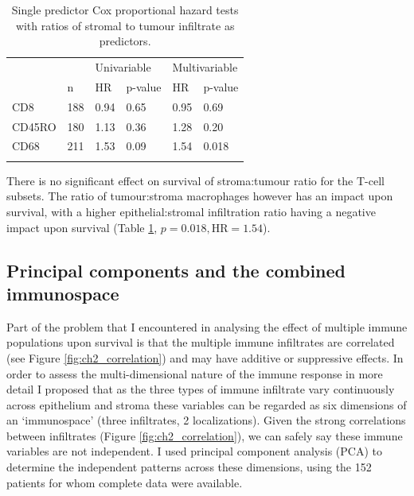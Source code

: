 \begin{table}[ht]
\centering
\begin{tabular}{llllll} \hline
 	&		&	\multicolumn{2}{l}{Univariable}			&	\multicolumn{2}{l}{Multivariable}			\\
 	    &	n	&	HR	&	p-value	    &	HR	&	p-value	\\ \hline
CD8	    &	188	&	0.94	&	0.65	&	0.95	&	0.69	\\
CD45RO	&	180	&	1.13	&	0.36	&	1.28	&	0.20	\\
CD68	&	211	&	1.53	&	0.09	&	1.54	&	0.018	\\

   \hline
\multicolumn{5}{l}{}\\
\end{tabular}
\caption[Cox regression for ratio of Tumour to Stroma infiltrate]{Single predictor Cox proportional hazard tests with ratios of stromal to tumour infiltrate as predictors.} 
\label{tab:s:t}
\end{table}
There is no significant effect on survival of stroma:tumour ratio for the T-cell subsets. The ratio of tumour:stroma macrophages however has an impact upon survival, with a higher epithelial:stromal infiltration ratio having a negative impact upon survival (Table \ref{tab:s:t}, $p=0.018, \mathrm{HR}=1.54$).

\subsection{Principal components and the combined immunospace}
 Part of the problem that I encountered in analysing the effect of multiple immune populations upon survival is that the multiple immune infiltrates are correlated (see Figure \ref{fig:ch2_correlation}) and may have additive or suppressive effects.  In order to assess the multi-dimensional nature of the immune response in more detail I proposed that as the three types of immune infiltrate vary continuously across epithelium and stroma these variables can be regarded as six dimensions of an ‘immunospace’ (three infiltrates, 2 localizations).  Given the strong correlations between infiltrates (Figure \ref{fig:ch2_correlation}), we can safely say these immune variables are not independent. I used principal component analysis (PCA) to determine the independent patterns across these dimensions, using the 152 patients for whom complete data were available.
 
